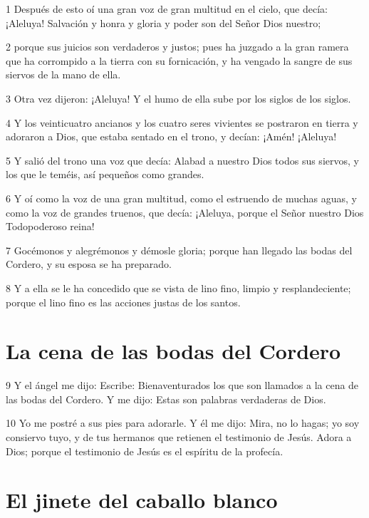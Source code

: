 \par 1 Después de esto oí una gran voz de gran multitud en el cielo, que decía: ¡Aleluya! Salvación y honra y gloria y poder son del Señor Dios nuestro;
\par 2 porque sus juicios son verdaderos y justos; pues ha juzgado a la gran ramera que ha corrompido a la tierra con su fornicación, y ha vengado la sangre de sus siervos de la mano de ella.
\par 3 Otra vez dijeron: ¡Aleluya! Y el humo de ella sube por los siglos de los siglos.
\par 4 Y los veinticuatro ancianos y los cuatro seres vivientes se postraron en tierra y adoraron a Dios, que estaba sentado en el trono, y decían: ¡Amén! ¡Aleluya!
\par 5 Y salió del trono una voz que decía: Alabad a nuestro Dios todos sus siervos, y los que le teméis, así pequeños como grandes.
\par 6 Y oí como la voz de una gran multitud, como el estruendo de muchas aguas, y como la voz de grandes truenos, que decía: ¡Aleluya, porque el Señor nuestro Dios Todopoderoso reina!
\par 7 Gocémonos y alegrémonos y démosle gloria; porque han llegado las bodas del Cordero, y su esposa se ha preparado.
\par 8 Y a ella se le ha concedido que se vista de lino fino, limpio y resplandeciente; porque el lino fino es las acciones justas de los santos.

\section*{La cena de las bodas del Cordero}

\par 9 Y el ángel me dijo: Escribe: Bienaventurados los que son llamados a la cena de las bodas del Cordero. Y me dijo: Estas son palabras verdaderas de Dios.
\par 10 Yo me postré a sus pies para adorarle. Y él me dijo: Mira, no lo hagas; yo soy consiervo tuyo, y de tus hermanos que retienen el testimonio de Jesús. Adora a Dios; porque el testimonio de Jesús es el espíritu de la profecía.

\section*{El jinete del caballo blanco}

